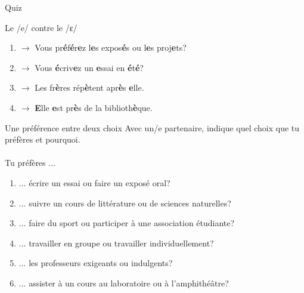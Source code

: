 \documentclass{beamer}
\begin{document}
  \begin{frame}{}
    \begin{center}
      \Large Quiz
    \end{center}
  \end{frame}

  \begin{frame}{Le /e/ contre le /ɛ/}
    \begin{enumerate}
      \item[/e/] $\to$ Vous pr\textbf{é}f\textbf{é}r\textbf{e}z l\textbf{e}s expos\textbf{é}s ou l\textbf{e}s proj\textbf{e}ts?
      \item[/e/] $\to$ Vous \textbf{é}criv\textbf{e}z un \textbf{e}ssai en \textbf{é}t\textbf{é}?
      \item[/ɛ/] $\to$ Les fr\textbf{è}res rép\textbf{è}tent apr\textbf{è}s \textbf{e}lle.
      \item[/ɛ/] $\to$ \textbf{E}lle \textbf{e}st pr\textbf{è}s de la biblioth\textbf{è}que.
    \end{enumerate}
  \end{frame}

  \begin{frame}{Une préférence entre deux choix}
    Avec un/e partenaire, indique quel choix que tu préfères et pourquoi. \\
     \\
    \vspace{1cm}
    Tu préfères ...
    \begin{enumerate}
      \item ... écrire un essai ou faire un exposé oral?
      \item ... suivre un cours de littérature ou de sciences naturelles?
      \item ... faire du sport ou participer à une association étudiante?
      \item ... travailler en groupe ou travailler individuellement?
      \item ... les professeurs exigeants  ou indulgents?
      \item ... assister à un cours au laboratoire ou à l'amphithéâtre?
    \end{enumerate}
  \end{frame}
\end{document}
